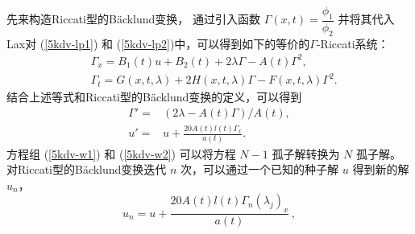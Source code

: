 先来构造Riccati型的B\"{a}cklund变换， 通过引入函数 $\Gamma(x,t)=\dfrac{\phi_1}{\phi_2}$  并将其代入 Lax对  (\ref{5kdv-lp1}) 和 (\ref{5kdv-lp2})中，可以得到如下的等价的$\Gamma$-Riccati系统：
\begin{align}
&\Gamma_x=B_1(t)u+B_2(t) + 2  \lambda \Gamma - A(t)\Gamma^2,\label{5kdv-r1}\\
&\Gamma_t=G(x,t,\lambda) + 2 H(x,t,\lambda) \Gamma - F(x,t,\lambda) \Gamma^2.\label{5kdv-r2}
\end{align}
结合上述等式和Riccati型的B\"{a}cklund变换的定义，可以得到
\begin{align}
\Gamma' =& (2 \lambda - A(t) \Gamma)/A(t), \label{5kdv-w1}\\
u'= & u+ \frac{20 A(t) l(t) \Gamma_x }{a(t)}. \label{5kdv-w2}
\end{align}
方程组 (\ref{5kdv-w1}) 和 (\ref{5kdv-w2}) 可以将方程
$N-1$ 孤子解转换为 $N$ 孤子解。  对Riccati型的B\"{a}cklund变换迭代 $n$ 次，可以通过一个已知的种子解 $u$ 得到新的解 $u_n$，
\begin{equation}
u_n=u+ \frac{20 A(t) l(t) \Gamma_n(\lambda_j)_x }{a(t)} \, , \label{5kdv-w5}
\end{equation}

